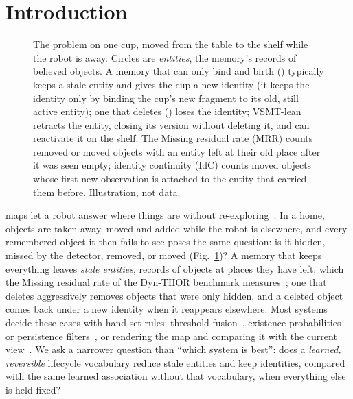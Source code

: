 \section{Introduction}
\label{sec:intro}

\begin{figure}[t]
\centering

\caption{The problem on one cup, moved from the table to the shelf while the robot is away. Circles are \emph{entities}, the memory's records of believed objects. A memory that can only bind and birth () typically keeps a stale entity and gives the cup a new identity (it keeps the identity only by binding the cup's new fragment to its old, still active entity); one that deletes () loses the identity; VSMT-lean retracts the entity, closing its version without deleting it, and can reactivate it on the shelf. The Missing residual rate (MRR) counts removed or moved objects with an entity left at their old place after it was seen empty; identity continuity (IdC) counts moved objects whose first new observation is attached to the entity that carried them before. Illustration, not data.}
\label{fig:overview}
\end{figure}

 maps let a robot answer where things are without re-exploring~\cite{fusionpp2018,conceptgraphs2024,hydra2022}.
In a home, objects are taken away, moved and added while the robot is elsewhere, and every remembered object it then fails to see poses the same question: is it hidden, missed by the detector, removed, or moved (Fig.~\ref{fig:overview})?
A memory that keeps everything leaves \emph{stale entities}, records of objects at places they have left, which the Missing residual rate of the Dyn-THOR benchmark measures~\cite{dsg2026}; one that deletes aggressively removes objects that were only hidden, and a deleted object comes back under a new identity when it reappears elsewhere.
Most systems decide these cases with hand-set rules: threshold fusion~\cite{conceptgraphs2024}, existence probabilities or persistence filters~\cite{fusionpp2018,rosen2016persistence,perpetua2025}, or rendering the map and comparing it with the current view~\cite{dsg2026,dynamicgsg2025}.
We ask a narrower question than ``which system is best'': does a \emph{learned, reversible} lifecycle vocabulary reduce stale entities and keep identities, compared with the same learned association without that vocabulary, when everything else is held fixed?

